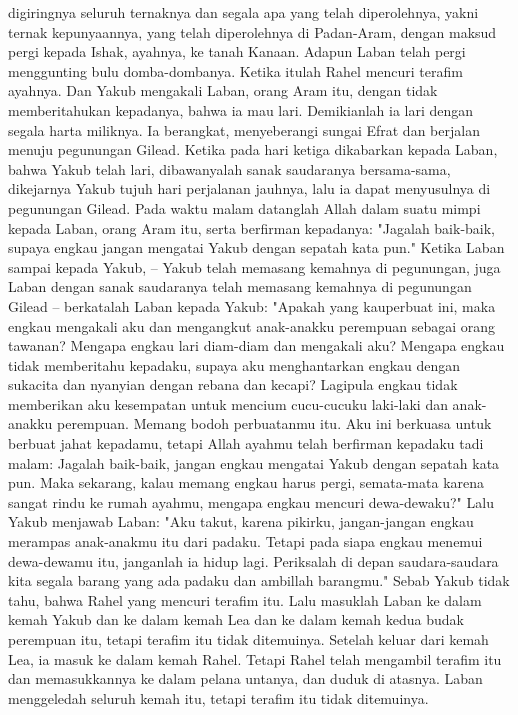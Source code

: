 \begin{biblechapter}
\verse digiringnya seluruh ternaknya dan segala apa yang telah diperolehnya, yakni ternak kepunyaannya, yang telah diperolehnya di Padan-Aram, dengan maksud pergi kepada Ishak, ayahnya, ke tanah Kanaan.
\verse Adapun Laban telah pergi menggunting bulu domba-dombanya. Ketika itulah Rahel mencuri terafim ayahnya.
\verse Dan Yakub mengakali Laban, orang Aram itu, dengan tidak memberitahukan kepadanya, bahwa ia mau lari.
\verse Demikianlah ia lari dengan segala harta miliknya. Ia berangkat, menyeberangi sungai Efrat dan berjalan menuju pegunungan Gilead.
 Ketika pada hari ketiga dikabarkan kepada Laban, bahwa Yakub telah lari,
\verse dibawanyalah sanak saudaranya bersama-sama, dikejarnya Yakub tujuh hari perjalanan jauhnya, lalu ia dapat menyusulnya di pegunungan Gilead.
\verse Pada waktu malam datanglah Allah dalam suatu mimpi kepada Laban, orang Aram itu, serta berfirman kepadanya: "Jagalah baik-baik, supaya engkau jangan mengatai Yakub dengan sepatah kata pun."
\verse Ketika Laban sampai kepada Yakub, -- Yakub telah memasang kemahnya di pegunungan, juga Laban dengan sanak saudaranya telah memasang kemahnya di pegunungan Gilead --
\verse berkatalah Laban kepada Yakub: "Apakah yang kauperbuat ini, maka engkau mengakali aku dan mengangkut anak-anakku perempuan sebagai orang tawanan?
\verse Mengapa engkau lari diam-diam dan mengakali aku? Mengapa engkau tidak memberitahu kepadaku, supaya aku menghantarkan engkau dengan sukacita dan nyanyian dengan rebana dan kecapi?
\verse Lagipula engkau tidak memberikan aku kesempatan untuk mencium cucu-cucuku laki-laki dan anak-anakku perempuan. Memang bodoh perbuatanmu itu.
\verse Aku ini berkuasa untuk berbuat jahat kepadamu, tetapi Allah ayahmu telah berfirman kepadaku tadi malam: Jagalah baik-baik, jangan engkau mengatai Yakub dengan sepatah kata pun.
\verse Maka sekarang, kalau memang engkau harus pergi, semata-mata karena sangat rindu ke rumah ayahmu, mengapa engkau mencuri dewa-dewaku?"
\verse Lalu Yakub menjawab Laban: "Aku takut, karena pikirku, jangan-jangan engkau merampas anak-anakmu itu dari padaku.
\verse Tetapi pada siapa engkau menemui dewa-dewamu itu, janganlah ia hidup lagi. Periksalah di depan saudara-saudara kita segala barang yang ada padaku dan ambillah barangmu." Sebab Yakub tidak tahu, bahwa Rahel yang mencuri terafim itu.
\verse Lalu masuklah Laban ke dalam kemah Yakub dan ke dalam kemah Lea dan ke dalam kemah kedua budak perempuan itu, tetapi terafim itu tidak ditemuinya. Setelah keluar dari kemah Lea, ia masuk ke dalam kemah Rahel.
\verse Tetapi Rahel telah mengambil terafim itu dan memasukkannya ke dalam pelana untanya, dan duduk di atasnya. Laban menggeledah seluruh kemah itu, tetapi terafim itu tidak ditemuinya.

\end{biblechapter}

